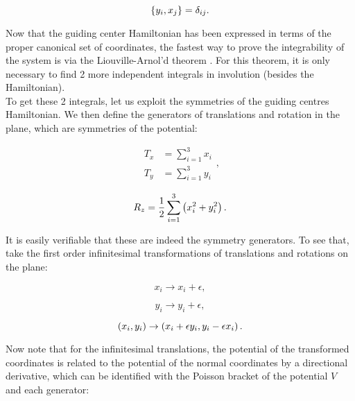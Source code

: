 \begin{equation}
\left\lbrace y_i, x_j \right\rbrace = \delta_{ij}.
\label{lastpb}
\end{equation}

Now that the guiding center Hamiltonian has been expressed in terms of the proper canonical set of coordinates, the fastest way to prove the integrability of the system is via the Liouville-Arnol'd theorem \cite[Sect. 49]{arnold}. For this theorem, it is only necessary to find 2 more independent integrals in involution (besides the Hamiltonian).\\

To get these 2 integrals, let us exploit the symmetries of the guiding centres Hamiltonian. We then define the generators of translations and rotation in the plane, which are symmetries of the potential:

\begin{equation}
\begin{aligned}
T_x &= \sum_{i=1}^{3} x_i \\
T_y &= \sum_{i=1}^{3} y_i 
\end{aligned},
\label{eq:gentranslation}
\end{equation}

\begin{equation}
R_z = \frac{1}{2} \sum_{i=1}^{3} \left( x_i^2 + y_i^2 \right).
\label{eq:genrotation}
\end{equation}

It is easily verifiable that these are indeed the symmetry generators. To see that, take the first order infinitesimal transformations of translations and rotations on the plane:

\begin{equation*}
x_i  \rightarrow x_i + \epsilon ,
\end{equation*}

\begin{equation*}
y_i \rightarrow y_i + \epsilon ,
\end{equation*}

\begin{equation*}
\left( x_i,y_i \right) \rightarrow \left( x_i +\epsilon y_i, y_i - \epsilon x_i \right).
\end{equation*}

Now note that for the infinitesimal translations, the potential of the transformed coordinates is related to the potential of the normal coordinates by a directional derivative, which can be identified with the Poisson bracket of the potential $V$ and each generator:

